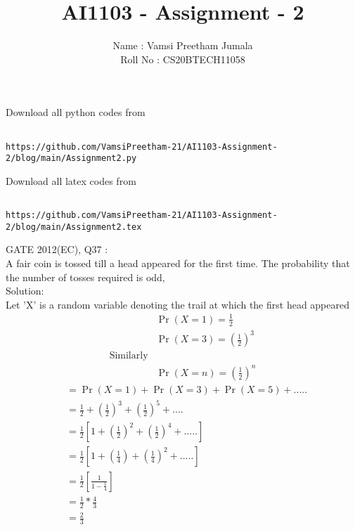 \documentclass[journal,12pt,twocolumn]{IEEEtran}
\title{AI1103 - Assignment - 2}
\author{Name : Vamsi Preetham Jumala \\Roll No : CS20BTECH11058}
\begin{document}
\maketitle


Download all python codes from
\begin{lstlisting}

https://github.com/VamsiPreetham-21/AI1103-Assignment-2/blog/main/Assignment2.py

\end{lstlisting}


Download all latex codes from
\begin{lstlisting}

https://github.com/VamsiPreetham-21/AI1103-Assignment-2/blog/main/Assignment2.tex
\end{lstlisting}

GATE 2012(EC), Q37 :\\
A fair coin is tossed till a head appeared for the first time. The probability that the number of tosses required is odd,\\

Solution:\\
Let 'X' is a random variable denoting the trail at which the first head appeared\\
\begin{align}
    &\Pr(X=1)=\frac{1}{2}\\
    &\Pr(X=3)=(\frac{1}{2})^3\\
    \text{Similarly}\\
    &\Pr(X=n)=(\frac{1}{2})^n
\end{align}
\begin{align}
    &=\Pr(X=1)+\Pr(X=3)+\Pr(X=5)+.....\\
    &=\frac{1}{2}+(\frac{1}{2})^3+(\frac{1}{2})^5+....\\
    &=\frac{1}{2}[1+(\frac{1}{2})^2+(\frac{1}{2})^4+.....]\\
    &=\frac{1}{2}[1+(\frac{1}{4})+(\frac{1}{4})^2+.....]\\
    &=\frac{1}{2}[\frac{1}{1-\frac{1}{4}}]\\
    &=\frac{1}{2}*\frac{4}{3}\\
    &=\frac{2}{3}
\end{align}
\end{document}
